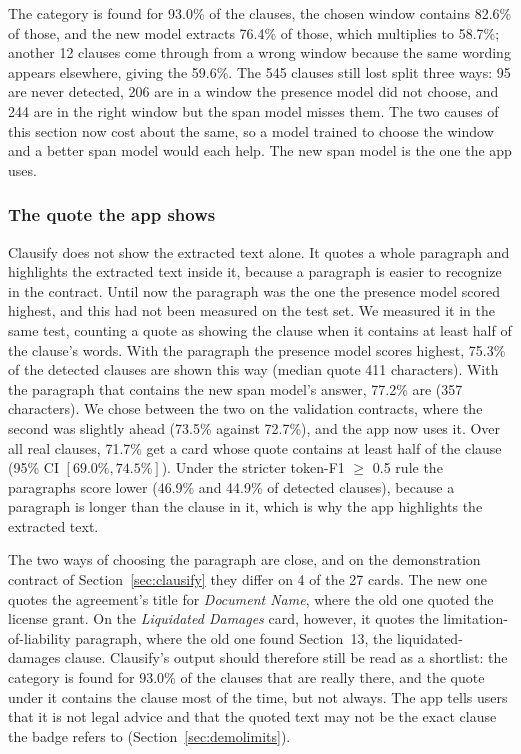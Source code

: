 The category is found for 93.0\% of the clauses, the chosen window contains 82.6\% of those, and the new model extracts 76.4\% of those, which multiplies to 58.7\%; another 12 clauses come through from a wrong window because the same wording appears elsewhere, giving the 59.6\%. The 545 clauses still lost split three ways: 95 are never detected, 206 are in a window the presence model did not choose, and 244 are in the right window but the span model misses them. The two causes of this section now cost about the same, so a model trained to choose the window and a better span model would each help. The new span model is the one the app uses.

\subsubsection{The quote the app shows}
Clausify does not show the extracted text alone. It quotes a whole paragraph and highlights the extracted text inside it, because a paragraph is easier to recognize in the contract. Until now the paragraph was the one the presence model scored highest, and this had not been measured on the test set. We measured it in the same test, counting a quote as showing the clause when it contains at least half of the clause's words. With the paragraph the presence model scores highest, 75.3\% of the detected clauses are shown this way (median quote 411 characters). With the paragraph that contains the new span model's answer, 77.2\% are (357 characters). We chose between the two on the validation contracts, where the second was slightly ahead (73.5\% against 72.7\%), and the app now uses it. Over all real clauses, 71.7\% get a card whose quote contains at least half of the clause (95\% CI $[69.0\%, 74.5\%]$). Under the stricter token-F1 $\geq$ 0.5 rule the paragraphs score lower (46.9\% and 44.9\% of detected clauses), because a paragraph is longer than the clause in it, which is why the app highlights the extracted text.

The two ways of choosing the paragraph are close, and on the demonstration contract of Section~\ref{sec:clausify} they differ on 4 of the 27 cards. The new one quotes the agreement's title for \emph{Document Name}, where the old one quoted the license grant. On the \emph{Liquidated Damages} card, however, it quotes the limitation-of-liability paragraph, where the old one found Section~13, the liquidated-damages clause. Clausify's output should therefore still be read as a shortlist: the category is found for 93.0\% of the clauses that are really there, and the quote under it contains the clause most of the time, but not always. The app tells users that it is not legal advice and that the quoted text may not be the exact clause the badge refers to (Section~\ref{sec:demolimits}).
